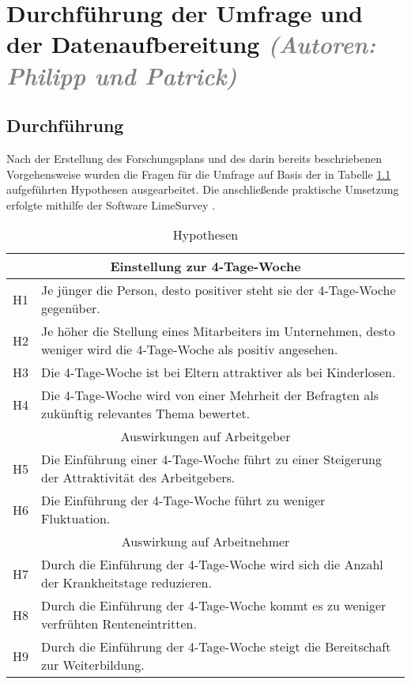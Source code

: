 \chapter{Durchführung der Umfrage und der Datenaufbereitung \textit{\textcolor{gray}{(Autoren: Philipp und Patrick)}}}

\section{Durchführung}

Nach der Erstellung des Forschungsplans und des darin bereits beschriebenen Vorgehensweise
wurden die Fragen für die Umfrage auf Basis der in Tabelle \ref{tab:hyptothesen} aufgeführten Hypothesen 
ausgearbeitet. Die anschließende praktische Umsetzung erfolgte mithilfe der Software LimeSurvey 
\parencite[vgl.][]{limesurvey_gmbh_limesurvey_nodate}. 


\begin{table}[h]
    \centering
      \begin{tabular}{|l|p{}|}
      \hline
      \multicolumn{2}{|c|}{Einstellung zur 4-Tage-Woche} \\ \hline
      H1 & Je jünger die Person, desto positiver steht sie der 4-Tage-Woche gegenüber. \\ \hline
      H2 & Je höher die Stellung eines Mitarbeiters im Unternehmen, desto weniger wird die 4-Tage-Woche als positiv angesehen. \\ \hline
      H3 & Die 4-Tage-Woche ist bei Eltern attraktiver als bei Kinderlosen. \\ \hline
      H4 & Die 4-Tage-Woche wird von einer Mehrheit der Befragten als zukünftig relevantes Thema bewertet. \\ \hline
      \multicolumn{2}{|c|}{Auswirkungen auf Arbeitgeber} \\ \hline
      H5 & Die Einführung einer 4-Tage-Woche führt zu einer Steigerung der Attraktivität des Arbeitgebers. \\ \hline
      H6 & Die Einführung der 4-Tage-Woche führt zu weniger Fluktuation. \\ \hline
      \multicolumn{2}{|c|}{Auswirkung auf Arbeitnehmer} \\ \hline
      H7 & Durch die Einführung der 4-Tage-Woche wird sich die Anzahl der Krankheitstage reduzieren. \\ \hline
      H8 & Durch die Einführung der 4-Tage-Woche kommt es zu weniger verfrühten Renteneintritten. \\ \hline
      H9 & Durch die Einführung der 4-Tage-Woche steigt die Bereitschaft zur Weiterbildung. \\ \hline
      \end{tabular}
      \caption{Hypothesen}
      \label{tab:hyptothesen}
\end{table}

